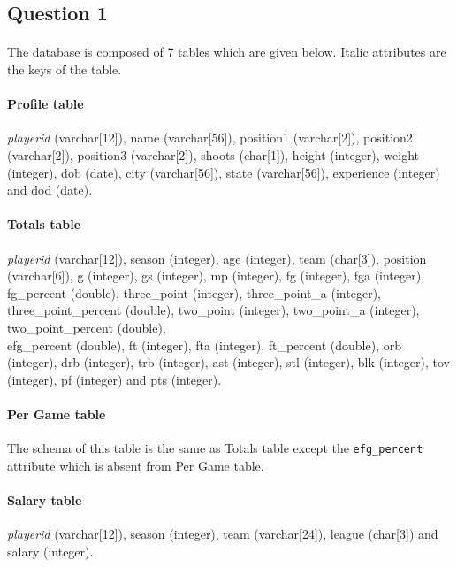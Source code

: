
\subsection{Question 1}
\label{subsec:411}

\paragraph{}The database is composed of 7 tables which are given below. Italic attributes are the keys of the table.

\paragraph{Profile table}\textit{playerid} (varchar[12]), name (varchar[56]), position1 (varchar[2]), position2 (varchar[2]), position3 (varchar[2]), shoots (char[1]), height (integer), weight (integer), dob (date), city (varchar[56]), state (varchar[56]), experience (integer) and dod (date).

\paragraph{Totals table}\textit{playerid} (varchar[12]), season (integer), age (integer), team (char[3]), position (varchar[6]), g (integer), gs (integer), mp (integer), fg (integer), fga (integer), fg\_percent (double), three\_point (integer), three\_point\_a (integer), three\_point\_percent (double), two\_point (integer), two\_point\_a (integer), two\_point\_percent (double), \\ efg\_percent (double), ft (integer), fta (integer), ft\_percent (double), orb (integer), drb (integer), trb (integer), ast (integer), stl (integer), blk (integer), tov (integer), pf (integer) and pts (integer).

\paragraph{Per Game table}The schema of this table is the same as Totals table except the \texttt{efg\_percent} attribute which is absent from Per Game table.

\paragraph{Salary table}\textit{playerid} (varchar[12]), season (integer), team (varchar[24]), league (char[3]) and salary (integer).

